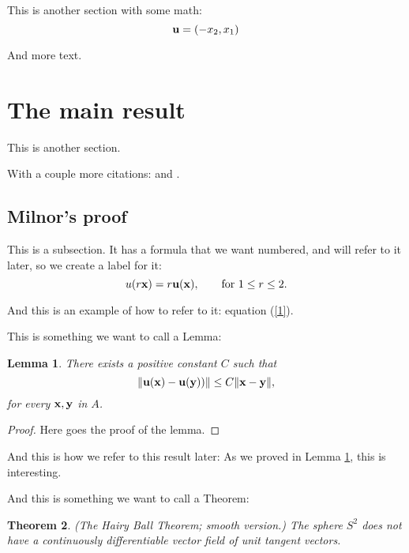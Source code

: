 \documentclass{amsart}
\newtheorem{theorem}{Theorem}[section]
\newtheorem{lemma}[theorem]{Lemma}
\theoremstyle{definition}
\numberwithin{equation}{section}
\def\ve#1{{\bf #1}}
\def\norm#1{\| {\bf #1} \|}
\def\norma#1{\| { #1} \|}
\begin{document}
\begin{sansmath}
This is another section
with some math:
    $$ \ve u = (-x_2, x_1) $$


And more text.
    \medskip



\section{The main result}

This is another section.

With a couple more citations:
 \cite{alexandrov} and
 \cite{milnor}.


    \bigskip


\subsection{Milnor's proof}

This is a subsection.
It has a formula that we want numbered, and will refer to it later,
so we create a label for it:
    \begin{equation}
    \label{1}
    u(r \ve x) = r \ve u(\ve x) , \qquad \hbox{for $1 \le r \le 2$.}
    \end{equation}

And this is an example of how to refer to it: equation (\ref{1}).


This is something we want to call a Lemma:

\begin{lemma}
\label{lemma1}
    There exists a positive constant $C$ such that
    $$ \norma{\ve u(\ve x)  - \ve u  (\ve y))} \le C \norm{x-y} , $$
    for every $\ve x, \ve y$ in $A$.
\end{lemma}



\begin{proof}
Here goes the proof of the lemma.
\end{proof}

And this is how we refer to this result later:
As we proved in Lemma \ref{lemma1}, this is interesting.


\medskip

And this is something we want to call a Theorem:


\begin{theorem}
\label{hairy}
{\em(The Hairy Ball Theorem; smooth version.)}
    The sphere $S^2$ does not have a continuously differentiable vector field of unit tangent vectors.
\end{theorem}




\end{sansmath}
\end{document}
